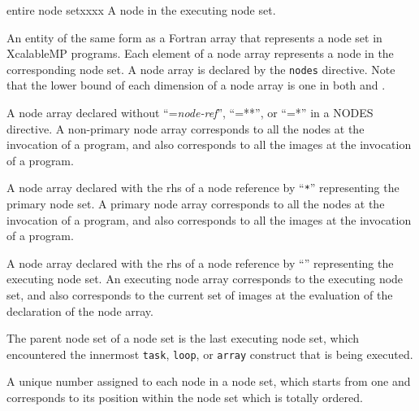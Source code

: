 \begin{namelist}{entire node setxxxx}
 A node in the executing node set.


 An {\XMP} entity of the same form as a Fortran array that represents a
 node set in XcalableMP programs. Each element of a node array
 represents a node in the corresponding node set. A node array is
 declared by the {\tt nodes} directive. Note that the lower bound of
 each dimension of a node array is one in both {\XMPF} and {\XMPC}.




A node array declared without ``={\it node-ref}'', ``=**'', or ``=*''
in a NODES directive.
A non-primary node array corresponds to all the nodes at the invocation of
a program, and also corresponds to all the images at the invocation of
a program.



 A node array declared with the rhs of a node reference by ``{\tt **}''
 representing the primary node set.
 A primary node array corresponds to all the nodes at the invocation of
 a program, and also corresponds to all the images at the invocation of
 a program.


 A node array declared with the rhs of a node reference by ``{\tt *}''
 representing the executing node set.
 An executing node array corresponds to the executing node set, and also
 corresponds to the current set of images at the evaluation of the
 declaration of the node array.


 The parent node set of a node set is the last executing node set, which
 encountered the innermost {\tt task}, {\tt loop}, or {\tt array}
 construct that is being executed.


 A unique number assigned to each node in a node set, which starts from
 one and corresponds to its position within the node set which is
 totally ordered.

%


\end{namelist}

